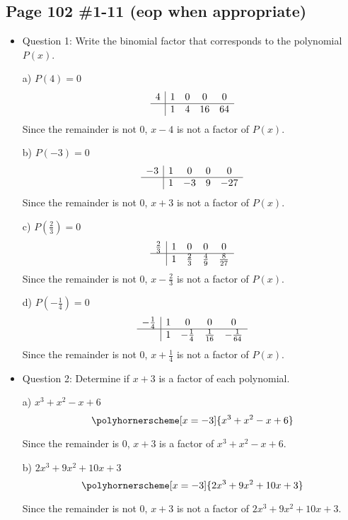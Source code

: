 \documentclass{article}
\begin{document}
\subsection*{Page 102 \#1-11 (eop when appropriate)}
\begin{itemize}
\item Question 1: 
Write the binomial factor that corresponds to the polynomial $P(x)$.

a) $P(4)=0$
\[
\begin{array}{c|cccc}
4 & 1 & 0 & 0 & 0 \\
\hline
 & 1 & 4 & 16 & 64 \\
\end{array}
\]
Since the remainder is not 0, $x - 4$ is not a factor of $P(x)$.

b) $P(-3)=0$
\[
\begin{array}{c|cccc}
-3 & 1 & 0 & 0 & 0 \\
\hline
 & 1 & -3 & 9 & -27 \\
\end{array}
\]
Since the remainder is not 0, $x + 3$ is not a factor of $P(x)$.

c) $P\left(\frac{2}{3}\right)=0$
\[
\begin{array}{c|cccc}
\frac{2}{3} & 1 & 0 & 0 & 0 \\
\hline
 & 1 & \frac{2}{3} & \frac{4}{9} & \frac{8}{27} \\
\end{array}
\]
Since the remainder is not 0, $x - \frac{2}{3}$ is not a factor of $P(x)$.

d) $P\left(-\frac{1}{4}\right)=0$
\[
\begin{array}{c|cccc}
-\frac{1}{4} & 1 & 0 & 0 & 0 \\
\hline
 & 1 & -\frac{1}{4} & \frac{1}{16} & -\frac{1}{64} \\
\end{array}
\]
Since the remainder is not 0, $x + \frac{1}{4}$ is not a factor of $P(x)$.



\item Question 2:
Determine if $x + 3$ is a factor of each polynomial.

a) $x^3+x^2-x+6$
$$\polyhornerscheme[x=-3]{x^3+x^2-x+6}$$

Since the remainder is 0, $x + 3$ is a factor of $x^3+x^2-x+6$.

b) $2x^3+9x^2+10x+3$
$$\polyhornerscheme[x=-3]{2x^3+9x^2+10x+3}$$

Since the remainder is not 0, $x + 3$ is not a factor of $2x^3+9x^2+10x+3$.


\end{itemize}
\end{document}
